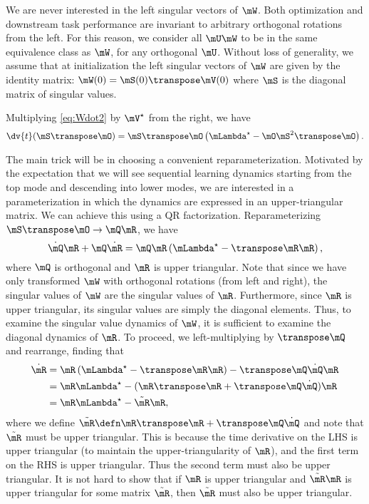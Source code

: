 We are never interested in the left singular vectors of $\mW$. Both optimization and downstream task performance are invariant to arbitrary orthogonal rotations from the left. For this reason, we consider all $\mU\mW$ to be in the same equivalence class as $\mW$, for any orthogonal $\mU$. Without loss of generality, we assume that at initialization the left singular vectors of $\mW$ are given by the identity matrix: $\mW(0)=\mS(0)\T\mV(0)$ where $\mS$ is the diagonal matrix of singular values.

Multiplying \cref{eq:Wdot2} by $\mV^\star$ from the right, we have
\begin{equation}
    \dv{t} (\mS\T\O) = \mS\T\O\left(\Lstar - \O\mS^2\T\O\right).
\end{equation}

The main trick will be in choosing a convenient reparameterization. Motivated by the expectation that we will see sequential learning dynamics starting from the top mode and descending into lower modes, we are interested in a parameterization in which the dynamics are expressed in an upper-triangular matrix. We can achieve this using a QR factorization. Reparameterizing $\mS\T\O \to \mQ\mR$, we have
\begin{equation}
    \dot\mQ\mR + \mQ\dot\mR = \mQ\mR\left(\Lstar - \T\mR\mR\right),
\end{equation}
where $\mQ$ is orthogonal and $\mR$ is upper triangular. Note that since we have only transformed $\mW$ with orthogonal rotations (from left and right), the singular values of $\mW$ are the singular values of $\mR$. Furthermore, since $\mR$ is upper triangular, its singular values are simply the diagonal elements. Thus, to examine the singular value dynamics of $\mW$, it is sufficient to examine the diagonal dynamics of $\mR$. To proceed, we left-multiplying by $\T\mQ$ and rearrange, finding that
\begin{align}
    \dot\mR &= \mR\left(\Lstar - \T\mR\mR\right) - \T\mQ\dot\mQ\mR \\
    &= \mR\Lstar - (\mR\T\mR + \T\mQ\dot\mQ)\mR\\
    &= \mR\Lstar - \tilde\mR\mR,
    \label{eq:Rdot}
\end{align}
where we define $\tilde\mR \defn \mR\T\mR + \T\mQ\dot\mQ$ and note that $\tilde\mR$ must be upper triangular. This is because the time derivative on the LHS is upper triangular (to maintain the upper-triangularity of $\mR$), and the first term on the RHS is upper triangular. Thus the second term must also be upper triangular. It is not hard to show that if $\mR$ is upper triangular and $\tilde\mR\mR$ is upper triangular for some matrix $\tilde\mR$, then $\tilde\mR$ must also be upper triangular.

